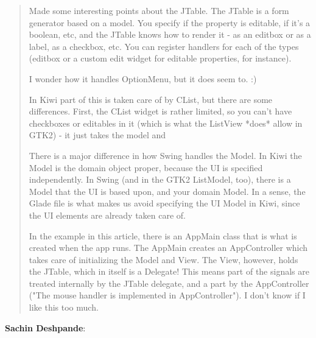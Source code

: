\documentclass[a4paper]{howto}
\begin{document}
\begin{quotation}

    Made some interesting points about the JTable. The JTable is a form
    generator based on a model. You specify if the property is editable,
    if it's a boolean, etc, and the JTable knows how to render it - as
    an editbox or as a label, as a checkbox, etc. You can register
    handlers for each of the types (editbox or a custom edit widget for
    editable properties, for instance).

    I wonder how it handles OptionMenu, but it does seem to. :)

    In Kiwi part of this is taken care of by CList, but there
    are some differences. First, the CList widget is rather limited, so
    you can't have checkboxes or editables in it (which is what the
    ListView *does* allow in GTK2) - it just takes the model and

    There is a major difference in how Swing handles the Model. In Kiwi
    the Model is the domain object proper, because the UI is specified
    independently. In Swing (and in the GTK2 ListModel, too), there is a
    Model that the UI is based upon, and your domain Model. In a sense,
    the Glade file is what makes us avoid specifying the UI Model in
    Kiwi, since the UI elements are already taken care of.

    In the example in this article, there is an AppMain class that is
    what is created when the app runs. The AppMain creates an
    AppController which takes care of initializing the Model and View.
    The View, however, holds the JTable, which in itself is a Delegate!
    This means part of the signals are treated internally by the JTable
    delegate, and a part by the AppController ("The mouse handler is
    implemented in AppController"). I don't know if I like this too
    much.

\end{quotation}

{\bf Sachin Deshpande}:
\end{document}
